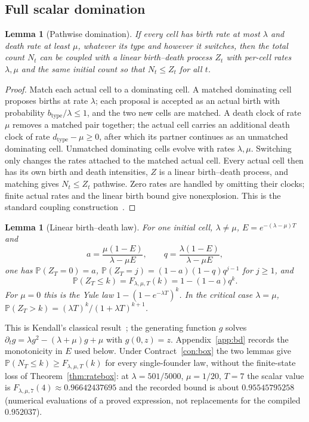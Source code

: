 \documentclass[11pt,a4paper]{article}
\theoremstyle{plain}
\newtheorem{lemma}[theorem]{Lemma}
\theoremstyle{definition}
\theoremstyle{remark}
\newcommand{\PP}{\mathbb P}
\begin{document}
\subsection{Full scalar domination}\label{sec:domination}
\begin{lemma}[Pathwise domination]\label{lem:coupling}
If every cell has birth rate at most $\lambda$ and death rate at least $\mu$, whatever its type and however it switches, then the total count $N_t$ can be coupled with a linear birth--death process $Z_t$ with per-cell rates $\lambda,\mu$ and the same initial count so that $N_t\le Z_t$ for all $t$.
\end{lemma}
\begin{proof}
Match each actual cell to a dominating cell. A matched dominating cell proposes births at rate $\lambda$; each proposal is accepted as an actual birth with probability $b_{\text{type}}/\lambda\le1$, and the two new cells are matched. A death clock of rate $\mu$ removes a matched pair together; the actual cell carries an additional death clock of rate $d_{\text{type}}-\mu\ge0$, after which its partner continues as an unmatched dominating cell. Unmatched dominating cells evolve with rates $\lambda,\mu$. Switching only changes the rates attached to the matched actual cell. Every actual cell then has its own birth and death intensities, $Z$ is a linear birth--death process, and matching gives $N_t\le Z_t$ pathwise. Zero rates are handled by omitting their clocks; finite actual rates and the linear birth bound give nonexplosion. This is the standard coupling construction~\citep{lindvall1992}.
\end{proof}

\begin{lemma}[Linear birth--death law]\label{lem:bd}
For one initial cell, $\lambda\ne\mu$, $E=e^{-(\lambda-\mu)T}$ and
\[
a=\frac{\mu(1-E)}{\lambda-\mu E},\qquad q=\frac{\lambda(1-E)}{\lambda-\mu E},
\]
one has $\PP(Z_T=0)=a$, $\PP(Z_T=j)=(1-a)(1-q)q^{j-1}$ for $j\ge1$, and
\begin{equation}\label{eq:bdcdf}
\PP(Z_T\le k)=F_{\lambda,\mu,T}(k)=1-(1-a)q^k .
\end{equation}
For $\mu=0$ this is the Yule law $1-(1-e^{-\lambda T})^k$. In the critical case $\lambda=\mu$, $\PP(Z_T>k)=(\lambda T)^k/(1+\lambda T)^{k+1}$.
\end{lemma}
This is Kendall's classical result~\citep{kendall1948,bailey1964}; the generating function $g$ solves $\partial_tg=\lambda g^2-(\lambda+\mu)g+\mu$ with $g(0,z)=z$. Appendix~\ref{app:bd} records the monotonicity in $E$ used below. Under Contract~\ref{con:box} the two lemmas give $\PP(N_T\le k)\ge F_{\lambda,\mu,T}(k)$ for every single-founder law, without the finite-state loss of Theorem~\ref{thm:ratebox}: at $\lambda=501/5000$, $\mu=1/20$, $T=7$ the scalar value is $F_{\lambda,\mu,7}(4)\approx0.96642437695$ and the recorded bound is about $0.95545795258$ (numerical evaluations of a proved expression, not replacements for the compiled $0.952037$).
\end{document}
